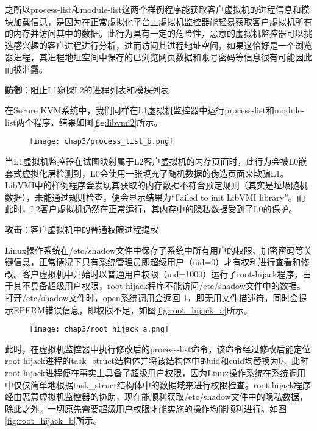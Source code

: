 之所以process-list和module-list这两个样例程序能获取客户虚拟机的进程信息和模块加载信息，是因为在正常虚拟化平台上虚拟机监控器能轻易获取客户虚拟机所有的内存并访问其中的数据。此行为具有一定的危险性，恶意的虚拟机监控器可以挑选感兴趣的客户进程进行分析，进而访问其进程地址空间，如果这恰好是一个浏览器进程，其进程地址空间中保存的已浏览网页数据和账号密码等信息很有可能因此而被泄露。

\noindent
\textbf{防御\uppercase\expandafter{}}：阻止L1窥探L2的进程列表和模块列表

在Secure KVM系统中，我们同样在L1虚拟机监控器中运行process-list和module-list两个程序，结果如图\ref{fig:libvmi2}所示。

\begin{figure}[!htbp]
  \centering
  \texttt{[image: chap3/process\_list\_b.png]}
\end{figure}

当L1虚拟机监控器在试图映射属于L2客户虚拟机的内存页面时，此行为会被L0嵌套式虚拟化层检测到，L0会使用一张填充了随机数据的伪造页面来欺骗L1。LibVMI中的样例程序会发现其获取的内存数据不符合预定规则（其实是垃圾随机数据），未能通过规则检查，便会显示结果为``Failed to init LibVMI library''。而此时，L2客户虚拟机仍然在正常运行，其内存中的隐私数据受到了L0的保护。

\noindent
\textbf{攻击\uppercase\expandafter{}}：客户虚拟机中的普通权限进程提权

Linux操作系统在/etc/shadow文件中保存了系统中所有用户的权限、加密密码等关键信息，正常情况下只有系统管理员即超级用户（uid=0）才有权利进行查看和修改。客户虚拟机中开始时以普通用户权限（uid=1000）运行了root-hijack程序，由于其不具备超级用户权限，root-hijack程序不能访问/etc/shadow文件中的数据。打开/etc/shadow文件时，open系统调用会返回-1，即无用文件描述符，同时会提示EPERM错误信息，即权限不足，如图\ref{fig:root_hijack_a}所示。

\begin{figure}[!htbp]
  \centering
  \texttt{[image: chap3/root\_hijack\_a.png]}
\end{figure}

此时，在虚拟机监控器中执行修改后的process-list命令，该命令经过修改后能定位root-hijack进程的task\_struct结构体并将该结构体中的uid和euid均替换为0，此时root-hijack进程便在事实上具备了超级用户权限，因为Linux操作系统在系统调用中仅仅简单地根据task\_struct结构体中的数据域来进行权限检查。root-hijack程序经由恶意虚拟机监控器的协助，现在能顺利获取/etc/shadow文件中的隐私数据，除此之外，一切原先需要超级用户权限才能实施的操作均能顺利进行。如图\ref{fig:root_hijack_b}所示。

